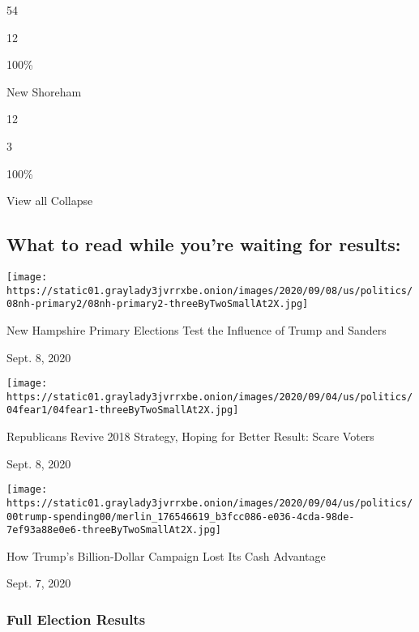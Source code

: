 54

12

100\%

New Shoreham

12

3

100\%

View all Collapse

\hypertarget{what-to-read-while-youre-waiting-for-results}{%
\subsection{What to read while you're waiting for
results:}\label{what-to-read-while-youre-waiting-for-results}}

\href{https://www.nytimes3xbfgragh.onion/2020/09/08/us/politics/nh-primary.html?action=click\&module=ELEX_results\&pgtype=Interactive\&region=RelatedCoverage}{}

\texttt{[image: https://static01.graylady3jvrrxbe.onion/images/2020/09/08/us/politics/08nh-primary2/08nh-primary2-threeByTwoSmallAt2X.jpg]}

New Hampshire Primary Elections Test the Influence of Trump and Sanders

Sept. 8, 2020

\href{https://www.nytimes3xbfgragh.onion/2020/09/08/us/politics/trump-republicans-fear-strategy.html?action=click\&module=ELEX_results\&pgtype=Interactive\&region=RelatedCoverage}{}

\texttt{[image: https://static01.graylady3jvrrxbe.onion/images/2020/09/04/us/politics/04fear1/04fear1-threeByTwoSmallAt2X.jpg]}

Republicans Revive 2018 Strategy, Hoping for Better Result: Scare Voters

Sept. 8, 2020

\href{https://www.nytimes3xbfgragh.onion/2020/09/07/us/politics/trump-election-campaign-fundraising.html?action=click\&module=ELEX_results\&pgtype=Interactive\&region=RelatedCoverage}{}

\texttt{[image: https://static01.graylady3jvrrxbe.onion/images/2020/09/04/us/politics/00trump-spending00/merlin\_176546619\_b3fcc086-e036-4cda-98de-7ef93a88e0e6-threeByTwoSmallAt2X.jpg]}

How Trump's Billion-Dollar Campaign Lost Its Cash Advantage

Sept. 7, 2020

\hypertarget{full-election-results}{%
\subsubsection{Full Election Results}\label{full-election-results}}


